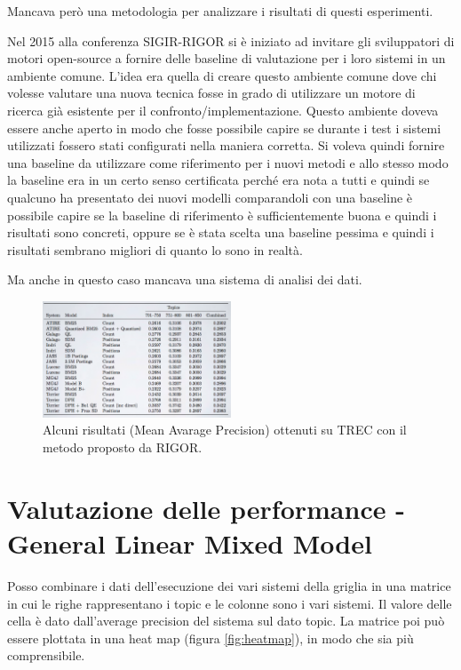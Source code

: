 Mancava però una metodologia per analizzare i risultati di questi esperimenti.

Nel 2015 alla conferenza SIGIR-RIGOR si è iniziato ad invitare gli sviluppatori di motori open-source a fornire delle baseline di valutazione per i loro sistemi in un ambiente comune.
L'idea era quella di creare questo ambiente comune dove chi volesse valutare una nuova tecnica fosse in grado di utilizzare un motore di ricerca già esistente per il confronto/implementazione. Questo ambiente doveva essere anche aperto in modo che fosse possibile capire se durante i test i sistemi utilizzati fossero stati configurati nella maniera corretta.
Si voleva quindi fornire una baseline da utilizzare come riferimento per i nuovi metodi e allo stesso modo la baseline era in un certo senso certificata perché era nota a tutti e quindi se qualcuno ha presentato dei nuovi modelli comparandoli con una baseline è possibile capire se la baseline di riferimento è sufficientemente buona e quindi i risultati sono concreti, oppure se è stata scelta una baseline pessima e quindi i risultati sembrano migliori di quanto lo sono in realtà.

Ma anche in questo caso mancava una sistema di analisi dei dati.

\begin{figure}[htbp]
	\centering
	\includegraphics[width=0.5\textwidth]{images/l20-fig-2}
	\caption{Alcuni risultati (Mean Avarage Precision) ottenuti su TREC con il metodo proposto da RIGOR.}
\end{figure} 

\section{Valutazione delle performance - General Linear Mixed Model}

Posso combinare i dati dell'esecuzione dei vari sistemi della griglia in una matrice in cui le righe rappresentano i topic e le colonne sono i vari sistemi. Il valore delle cella è dato dall'average precision del sistema sul dato topic.
La matrice poi può essere plottata in una heat map (figura \ref{fig:heatmap}), in modo che sia più comprensibile.

